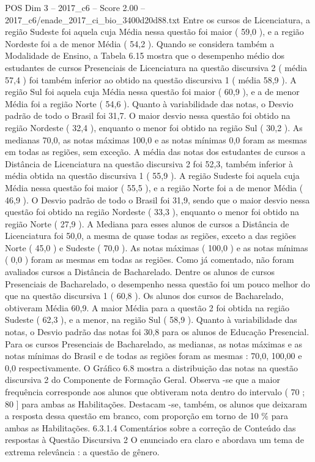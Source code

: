 \begin{textsample}{POS Dim 3 – 2017\_c6 – Score 2.00 – 2017\_c6/enade\_2017\_ci\_bio\_3400d20d88.txt}
Entre os cursos de Licenciatura, a região Sudeste foi aquela cuja Média nessa questão foi maior ( 59,0 ), e a região Nordeste foi a de menor Média ( 54,2 ).
Quando se considera também a Modalidade de Ensino, a Tabela 6.15 mostra que o desempenho médio dos estudantes de cursos Presenciais de Licenciatura na questão discursiva 2 ( média 57,4 ) foi também inferior ao obtido na questão discursiva 1 ( média 58,9 ).
A região Sul foi aquela cuja Média nessa questão foi maior ( 60,9 ), e a de menor Média foi a região Norte ( 54,6 ).
Quanto à variabilidade das notas, o Desvio padrão de todo o Brasil foi 31,7.
O maior desvio nessa questão foi obtido na região Nordeste ( 32,4 ), enquanto o menor foi obtido na região Sul ( 30,2 ).
As medianas 70,0, as notas máximas 100,0 e as notas mínimas 0,0 foram as mesmas em todas as regiões, sem exceção.
A média das notas dos estudantes de cursos a Distância de Licenciatura na questão discursiva 2 foi 52,3, também inferior à média obtida na questão discursiva 1 ( 55,9 ).
A região Sudeste foi aquela cuja Média nessa questão foi maior ( 55,5 ), e a região Norte foi a de menor Média ( 46,9 ).
O Desvio padrão de todo o Brasil foi 31,9, sendo que o maior desvio nessa questão foi obtido na região Nordeste ( 33,3 ), enquanto o menor foi obtido na região Norte ( 27,9 ).
A Mediana para esses alunos de cursos a Distância de Licenciatura foi 50,0, a mesma de quase todas as regiões, exceto a das regiões Norte ( 45,0 ) e Sudeste ( 70,0 ).
As notas máximas ( 100,0 ) e as notas mínimas ( 0,0 ) foram as mesmas em todas as regiões.
Como já comentado, não foram avaliados cursos a Distância de Bacharelado.
Dentre os alunos de cursos Presenciais de Bacharelado, o desempenho nessa questão foi um pouco melhor do que na questão discursiva 1 ( 60,8 ).
Os alunos dos cursos de Bacharelado, obtiveram Média 60,9.
A maior Média para a questão 2 foi obtida na região Sudeste ( 62,3 ), e a menor, na região Sul ( 58,9 ).
Quanto à variabilidade das notas, o Desvio padrão das notas foi 30,8 para os alunos de Educação Presencial.
Para os cursos Presenciais de Bacharelado, as medianas, as notas máximas e as notas mínimas do Brasil e de todas as regiões foram as mesmas : 70,0, 100,00 e 0,0 respectivamente.
O Gráfico 6.8 mostra a distribuição das notas na questão discursiva 2 do Componente de Formação Geral.
Observa -se que a maior frequência corresponde aos alunos que obtiveram nota dentro do intervalo ( 70 ; 80 ] para ambas as Habilitações.
Destacam -se, também, os alunos que deixaram a resposta dessa questão em branco, com proporção em torno de 10 \% para ambas as Habilitações. 6.3.1.4 Comentários sobre a correção de Conteúdo das respostas à Questão Discursiva 2 O enunciado era claro e abordava um tema de extrema relevância : a questão de gênero.

\end{textsample}
